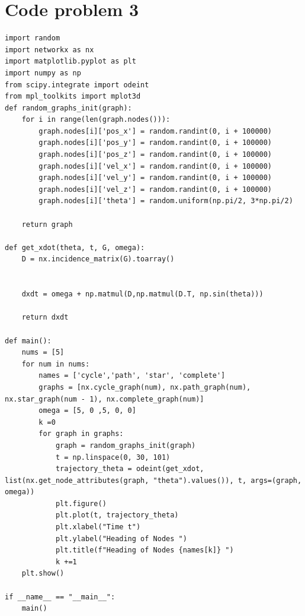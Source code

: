 \documentclass{article}
\begin{document}
\section*{Code problem 3}
\begin{verbatim}
import random
import networkx as nx
import matplotlib.pyplot as plt
import numpy as np
from scipy.integrate import odeint
from mpl_toolkits import mplot3d
def random_graphs_init(graph):
    for i in range(len(graph.nodes())):
        graph.nodes[i]['pos_x'] = random.randint(0, i + 100000)
        graph.nodes[i]['pos_y'] = random.randint(0, i + 100000)
        graph.nodes[i]['pos_z'] = random.randint(0, i + 100000)
        graph.nodes[i]['vel_x'] = random.randint(0, i + 100000)
        graph.nodes[i]['vel_y'] = random.randint(0, i + 100000)
        graph.nodes[i]['vel_z'] = random.randint(0, i + 100000)
        graph.nodes[i]['theta'] = random.uniform(np.pi/2, 3*np.pi/2)

    return graph

def get_xdot(theta, t, G, omega):
    D = nx.incidence_matrix(G).toarray()


    dxdt = omega + np.matmul(D,np.matmul(D.T, np.sin(theta)))
    
    return dxdt 

def main():
    nums = [5]
    for num in nums:
        names = ['cycle','path', 'star', 'complete']
        graphs = [nx.cycle_graph(num), nx.path_graph(num), nx.star_graph(num - 1), nx.complete_graph(num)]
        omega = [5, 0 ,5, 0, 0]
        k =0
        for graph in graphs:
            graph = random_graphs_init(graph)
            t = np.linspace(0, 30, 101)
            trajectory_theta = odeint(get_xdot, list(nx.get_node_attributes(graph, "theta").values()), t, args=(graph, omega))
            plt.figure()
            plt.plot(t, trajectory_theta)
            plt.xlabel("Time t")
            plt.ylabel("Heading of Nodes ")
            plt.title(f"Heading of Nodes {names[k]} ")
            k +=1
    plt.show()

if __name__ == "__main__":
    main()
\end{verbatim}
\end{document}
